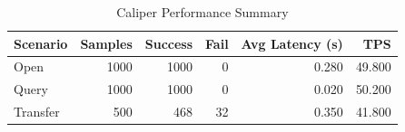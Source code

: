 \begin{table}
\caption{Caliper Performance Summary}
\label{tab:caliper_round}
\begin{tabular}{lrrrrr}
\toprule
Scenario & Samples & Success & Fail & Avg Latency (s) & TPS \\
\midrule
Open & 1000 & 1000 & 0 & 0.280 & 49.800 \\
Query & 1000 & 1000 & 0 & 0.020 & 50.200 \\
Transfer & 500 & 468 & 32 & 0.350 & 41.800 \\
\bottomrule
\end{tabular}
\end{table}

